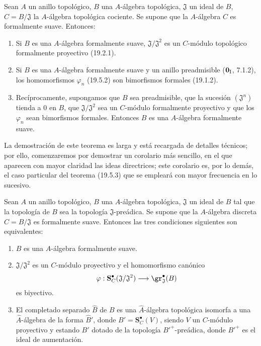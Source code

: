 \begin{theorem}[19.5.3]
\label{0.19.5.3-fr}
Sean $A$ un anillo topológico, $B$ una $A$-álgebra topológica,
$\mathfrak J$ un ideal de $B$, $C=B/\mathfrak J$ la $A$-álgebra topológica
cociente. Se supone que la $A$-álgebra $C$ es formalmente suave.
Entonces:
\begin{enumerate}
  \item[\rm(i)] Si $B$ es una $A$-álgebra formalmente suave,
  $\mathfrak J/\mathfrak J^2$ es un $C$-módulo topológico formalmente
  proyectivo \textup{(19.2.1)}.
  \item[\rm(ii)] Si $B$ es una $A$-álgebra formalmente suave y un anillo
  preadmisible \textup{($\mathbf 0_{\rm I}$, 7.1.2)}, los homomorfismos $\varphi_n$
  \textup{(19.5.2)} son bimorfismos formales \textup{(19.1.2)}.
  \item[\rm(iii)] Recíprocamente, supongamos que $B$ sea preadmisible, que la
  sucesión $(\mathfrak J^n)$ tienda a $0$ en $B$, que
  $\mathfrak J/\mathfrak J^2$ sea un $C$-módulo formalmente proyectivo y que
  los $\varphi_n$ sean bimorfismos formales. Entonces $B$ es una
  $A$-álgebra formalmente suave.
\end{enumerate}
\end{theorem}

La demostración de este teorema es larga y está recargada de detalles técnicos;
por ello, comenzaremos por demostrar un corolario más sencillo, en el que
aparecen con mayor claridad las ideas directrices; este corolario es, por lo demás,
el caso particular del teorema (19.5.3) que se empleará con mayor frecuencia
en lo sucesivo.

\begin{corollary}[19.5.4.]
\label{0.19.5.4-fr}
Sean $A$ un anillo topológico, $B$ una $A$-álgebra topológica,
$\mathfrak J$ un ideal de $B$ tal que la topología de $B$ sea la topología
$\mathfrak J$-preádica. Se supone que la $A$-álgebra discreta
$C=B/\mathfrak J$ es formalmente suave. Entonces las tres condiciones siguientes
son equivalentes:
\begin{enumerate}
  \item[\textup{a)}] $B$ es una $A$-álgebra formalmente suave.
  \item[\textup{b)}] $\mathfrak J/\mathfrak J^2$ es un $C$-módulo proyectivo y
  el homomorfismo canónico
  \[
    \varphi:\mathbf S_C^\bullet(\mathfrak J/\mathfrak J^2)
    \longrightarrow\gr_{\mathfrak J}^\bullet(B)
  \]
  es biyectivo.
  \item[\textup{c)}] El completado separado $\widehat B$ de $B$ es una
  $\widehat A$-álgebra topológica isomorfa a una $\widehat A$-álgebra de la
  forma $\widehat{B}'$, donde $B'=\mathbf S_C^\bullet(V)$, siendo $V$ un $C$-módulo
  proyectivo y estando $B'$ dotado de la topología ${B'}^+$-preádica, donde
  ${B'}^+$ es el ideal de aumentación.
\end{enumerate}
\end{corollary}

